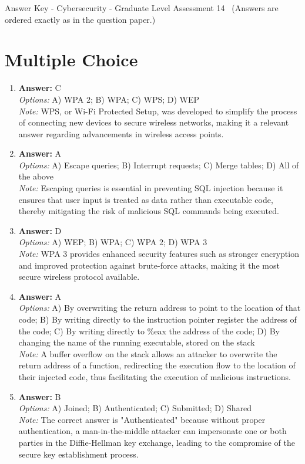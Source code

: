 \documentclass[12pt]{article}
\begin{document}
\begin{center}
Answer Key - Cybersecurity - Graduate Level Assessment 14 \
\small (Answers are ordered exactly as in the question paper.)
\end{center}

\section*{Multiple Choice}
\begin{enumerate}[label=\arabic*.]
\item \textbf{Answer:} C
\\ \textit{Options:} A) WPA 2; B) WPA; C) WPS; D) WEP
\\ \textit{Note:} WPS, or Wi-Fi Protected Setup, was developed to simplify the process of connecting new devices to secure wireless networks, making it a relevant answer regarding advancements in wireless access points.
\item \textbf{Answer:} A
\\ \textit{Options:} A) Escape queries; B) Interrupt requests; C) Merge tables; D) All of the above
\\ \textit{Note:} Escaping queries is essential in preventing SQL injection because it ensures that user input is treated as data rather than executable code, thereby mitigating the risk of malicious SQL commands being executed.
\item \textbf{Answer:} D
\\ \textit{Options:} A) WEP; B) WPA; C) WPA 2; D) WPA 3
\\ \textit{Note:} WPA 3 provides enhanced security features such as stronger encryption and improved protection against brute-force attacks, making it the most secure wireless protocol available.
\item \textbf{Answer:} A
\\ \textit{Options:} A) By overwriting the return address to point to the location of that code; B) By writing directly to the instruction pointer register the address of the code; C) By writing directly to \%eax the address of the code; D) By changing the name of the running executable, stored on the stack
\\ \textit{Note:} A buffer overflow on the stack allows an attacker to overwrite the return address of a function, redirecting the execution flow to the location of their injected code, thus facilitating the execution of malicious instructions.
\item \textbf{Answer:} B
\\ \textit{Options:} A) Joined; B) Authenticated; C) Submitted; D) Shared
\\ \textit{Note:} The correct answer is "Authenticated" because without proper authentication, a man-in-the-middle attacker can impersonate one or both parties in the Diffie-Hellman key exchange, leading to the compromise of the secure key establishment process.
\end{enumerate}
\end{document}
